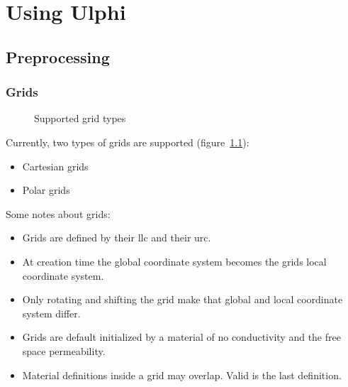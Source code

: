 %
%
%
%
%

\chapter{Using Ulphi}
\label{cha:practical-aspects}

\section{Preprocessing}
\label{sec:preprocessing}

\subsection{Grids}
\label{sec:grids}

\begin{figure}
  \centering
  \begin{maxipage}
    \hfil
    \subfloat[cartesian]{
      }
    \hfil
    \subfloat[polar]{
      }
    \hfil
  \caption{Supported grid types}
  \label{fig:sup-grid-types}
  \end{maxipage}
\end{figure}
Currently, two types of grids are supported (figure~\ref{fig:sup-grid-types}):
\begin{itemize}
\item Cartesian grids
\item Polar grids
\end{itemize}
Some notes about grids:
\begin{itemize}
\item Grids are defined by their \gls{llc} and their \gls{urc}.
\item At creation time the global coordinate system becomes the grids
  local coordinate system.
\item Only rotating and shifting the grid make that global and local
  coordinate system differ.
\item Grids are default initialized by a material of no conductivity and the
  free space permeability.
\item Material definitions inside a grid may overlap. Valid is the
  last definition.
\end{itemize}

